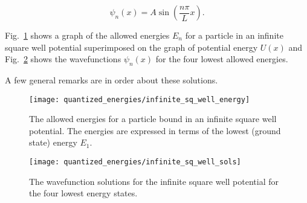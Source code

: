 \begin{equation}
\label{eq:squarewell_7}
\psi_n(x) = A \sin{\left(\frac{n \pi}{L}x\right)} .
\end{equation}

Fig.~\ref{fig:infinite_sq_well_energy} shows a graph of the
allowed energies $E_n$ for a particle in an infinite square well
potential superimposed on the graph of potential energy $U(x)$ and
Fig.~\ref{fig:infinite_sq_well_solutions} shows the wavefunctions
$\psi_n(x)$ for the four lowest allowed energies.

A few general remarks are in order about these solutions. 
\begin{figure}[!b]
\begin{center}
\texttt{[image: quantized\_energies/infinite\_sq\_well\_energy]}
\end{center}
\caption{The allowed energies for a particle bound in an infinite
  square well potential. The energies are expressed in terms of the
  lowest (ground state) energy $E_1$.}
\label{fig:infinite_sq_well_energy}
\end{figure}

\begin{figure}[!t]
\begin{center}
\texttt{[image: quantized\_energies/infinite\_sq\_well\_sols]}
\end{center}
\caption{The wavefunction solutions for the infinite square well
  potential for the four lowest energy states.}
\label{fig:infinite_sq_well_solutions}
\end{figure} 


